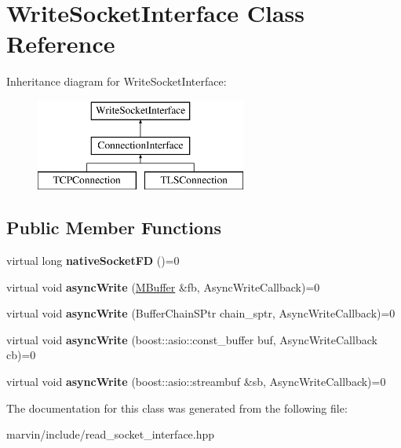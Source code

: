 \hypertarget{class_write_socket_interface}{}\section{Write\+Socket\+Interface Class Reference}
\label{class_write_socket_interface}
Inheritance diagram for Write\+Socket\+Interface\+:\begin{figure}[H]
\begin{center}
\leavevmode
\includegraphics[height=3.000000cm]{class_write_socket_interface}
\end{center}
\end{figure}
\subsection*{Public Member Functions}
\begin{DoxyCompactItemize}
\item 
\mbox{\label{class_write_socket_interface_a3eccd4e4d2ba0f5ca8528114f53dc178}} 
virtual long {\bfseries native\+Socket\+FD} ()=0
\item 
\mbox{\label{class_write_socket_interface_abe92a0daa62bf30872c3655f4c1ce17b}} 
virtual void {\bfseries async\+Write} (\hyperlink{struct_m_buffer}{M\+Buffer} \&fb, Async\+Write\+Callback)=0
\item 
\mbox{\label{class_write_socket_interface_a00e0406455f67da23061ec429e56528d}} 
virtual void {\bfseries async\+Write} (Buffer\+Chain\+S\+Ptr chain\+\_\+sptr, Async\+Write\+Callback)=0
\item 
\mbox{\label{class_write_socket_interface_a7e8ef6da94a56889a7ad6d7490fc1ebb}} 
virtual void {\bfseries async\+Write} (boost\+::asio\+::const\+\_\+buffer buf, Async\+Write\+Callback cb)=0
\item 
\mbox{\label{class_write_socket_interface_af38fe8608053b52b086f6a063cef8b4a}} 
virtual void {\bfseries async\+Write} (boost\+::asio\+::streambuf \&sb, Async\+Write\+Callback)=0
\end{DoxyCompactItemize}


The documentation for this class was generated from the following file\+:\begin{DoxyCompactItemize}
\item 
marvin/include/read\+\_\+socket\+\_\+interface.\+hpp\end{DoxyCompactItemize}
